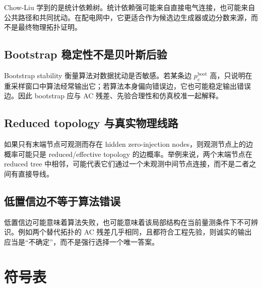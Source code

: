 \documentclass[UTF8,12pt,openany]{ctexrep}
\numberwithin{equation}{chapter}
\theoremstyle{definition}
\theoremstyle{plain}
\begin{document}
Chow-Liu 学到的是统计依赖树。统计依赖强可能来自直接电气连接，也可能来自公共路径和共同扰动。在配电网中，它更适合作为候选边生成器或边分数来源，而不是最终物理拓扑证明。

\section{Bootstrap 稳定性不是贝叶斯后验}

Bootstrap stability 衡量算法对数据扰动是否敏感。若某条边 $p_e^{\mathrm{boot}}$ 高，只说明在重采样窗口中算法经常输出它；若算法本身偏向错误边，它也可能稳定输出错误边。因此 bootstrap 应与 AC 残差、先验合理性和仿真校准一起解释。

\section{Reduced topology 与真实物理线路}

如果只有末端节点可观测而存在 hidden zero-injection nodes，则观测节点上的边概率可能只是 reduced/effective topology 的边概率。举例来说，两个末端节点在 reduced tree 中相邻，可能代表它们通过一个未观测中间节点连接，而不是二者之间有直接导线。

\section{低置信边不等于算法错误}

低置信边可能意味着算法失败，也可能意味着该局部结构在当前量测条件下不可辨识。例如两个替代拓扑的 AC 残差几乎相同，且都符合工程先验，则诚实的输出应当是“不确定”，而不是强行选择一个唯一答案。

\chapter{符号表}
\end{document}
